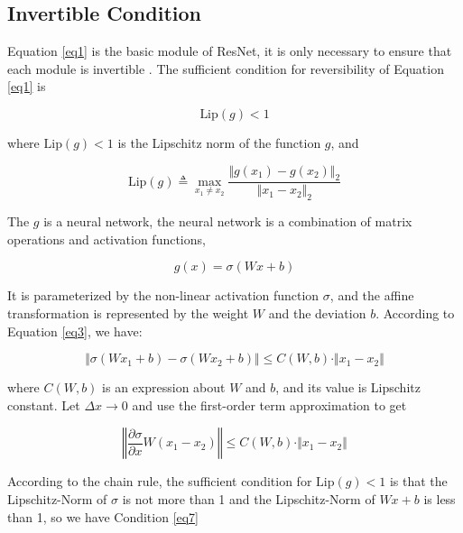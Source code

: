 \documentclass[final]{cvpr}
\begin{document}
\subsection{Invertible Condition}\label{sec31}
Equation \ref{eq1} is the basic module of ResNet, it is only necessary to ensure that each module is invertible . The sufficient condition for reversibility of Equation \ref{eq1} is

\begin{equation}
   \text{Lip}(g) <1
   \label{eq2}
\end{equation}

where $\text{Lip}(g) <1$ is the Lipschitz norm of the function $g$, and

\begin{equation}
   \text{Lip}(g) \triangleq \max_{x_1\neq x_2}\frac{\Vert g(x_1)-g(x_2)\Vert_2}{\Vert x_1-x_2\Vert_2}
   \label{eq3}
\end{equation}

The $g$ is a neural network, the neural network is a combination of matrix operations and activation functions,

\begin{equation}
   g(x)=\sigma(Wx+b)
\end{equation}

It is parameterized by the non-linear activation function $ \sigma$, and the affine transformation is represented by the weight $ W $ and the deviation $ b$. According to Equation \ref{eq3}, we have:


\begin{equation}
   \Vert \sigma(Wx_1+b)-\sigma(Wx_2+b)\Vert\leq C(W,b)\cdot \Vert x_1-x_2 \Vert
\end{equation}

where $C(W,b)$ is an expression about $W$ and $b$, and its value is Lipschitz constant. Let $\Delta x \to 0$ and use the first-order term approximation to get

\begin{equation}
   \left\Vert \frac{\partial \sigma}{\partial x}W(x_1-x_2)\right\Vert\leq C(W,b)\cdot \Vert x_1-x_2 \Vert
   \label{eq6}
\end{equation}

According to the chain rule, the sufficient condition for $\text{Lip}(g) <1$ is that the Lipschitz-Norm of $ \sigma$ is not more than 1 and the Lipschitz-Norm of $Wx+b$ is less than 1, so we have Condition \ref{eq7}
\end{document}
